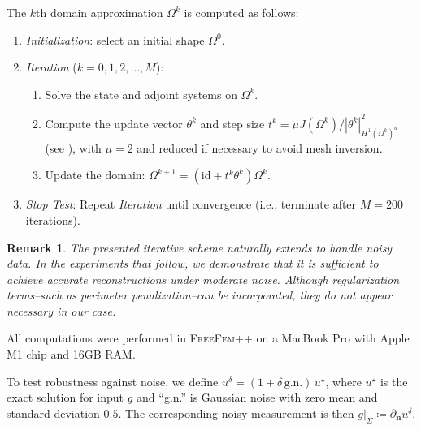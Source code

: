 \documentclass[a4paper,11pt]{article}
\newtheorem{remark}{Remark}
\newcommand{\vect}[1]{\boldsymbol{\mathbf{#1}}}
\newcommand{\VV}{\theta}
\newcommand{\nn}{\vect{n}}
\newcommand{\dn}[1]{\partial_{\nn}{#1}}
\begin{document}
The $k$th domain approximation $\varOmega^k$ is computed as follows:
\begin{enumerate}[label=\arabic*.]
    \item \textit{Initialization}: select an initial shape $\varOmega^0$.
    \item \textit{Iteration} ($k = 0,1,2,\dots, M$):
    \begin{enumerate}[label*=\arabic*.]
        \item Solve the state and adjoint systems on $\varOmega^k$.
        \item Compute the update vector $\VV^k$ and step size $t^k = \mu J(\varOmega^k)/|\VV^k|_{H^1(\varOmega^k)^d}^2$ (see \cite{RabagoAzegami2020}), with $\mu = 2$ and reduced if necessary to avoid mesh inversion.
        \item Update the domain: $\varOmega^{k+1} = (\mathrm{id} + t^k \VV^k) \varOmega^k$.
    \end{enumerate}
    \item \textit{Stop Test}: Repeat \textit{Iteration} until convergence (i.e., terminate after $M=200$ iterations).
\end{enumerate}
\begin{remark}\label{rem:no_need_for_perimeter_functional}
The presented iterative scheme naturally extends to handle noisy data. In the experiments that follow, we demonstrate that it is sufficient to achieve accurate reconstructions under moderate noise. Although regularization terms--such as perimeter penalization--can be incorporated, they do not appear necessary in our case.
\end{remark}
All computations were performed in \textsc{FreeFem++} \cite{Hecht2012} on a MacBook Pro with Apple M1 chip and 16GB RAM.

To test robustness against noise, we define $u^\delta = (1 + \delta\,\text{g.n.})\, u^\star$, where $u^\star$ is the exact solution for input $g$ and ``g.n.'' is Gaussian noise with zero mean and standard deviation $0.5$.  
The corresponding noisy measurement is then $g|_{\varSigma} \coloneqq \dn{u^\delta}$.
\end{document}
